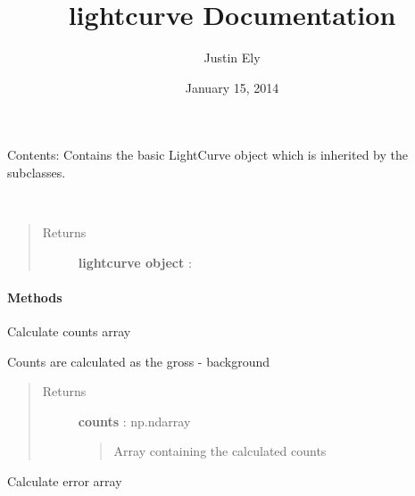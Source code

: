 \documentclass[letterpaper,10pt,english]{sphinxmanual}
\title{lightcurve Documentation}
\date{January 15, 2014}
\author{Justin Ely}
\begin{document}
\maketitle
\tableofcontents
{}\label{index::doc}


Contents:
\label{index:module-lightcurve.lightcurve}
Contains the basic LightCurve object which is inherited by the subclasses.

\begin{fulllineitems}
\label{index:lightcurve.lightcurve.LightCurve}~\begin{quote}\begin{description}
\item[{Returns }] \leavevmode
\textbf{lightcurve object} :

\end{description}\end{quote}
\paragraph{Methods}

\begin{fulllineitems}
\label{index:lightcurve.lightcurve.LightCurve.counts}
Calculate counts array

Counts are calculated as the gross - background
\begin{quote}\begin{description}
\item[{Returns }] \leavevmode
\textbf{counts} : np.ndarray
\begin{quote}

Array containing the calculated counts
\end{quote}

\end{description}\end{quote}

\end{fulllineitems}


\begin{fulllineitems}
\label{index:lightcurve.lightcurve.LightCurve.error}
Calculate error array


\end{fulllineitems}
\end{fulllineitems}
\end{document}
